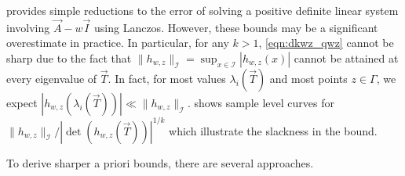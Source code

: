 provides simple reductions to the error of solving a positive definite linear system involving \( \vec{A} - w\vec{I} \) using Lanczos. 
However, these bounds may be a significant overestimate in practice.
In particular, for any \( k>1 \), \cref{eqn:dkwz_qwz} cannot be sharp due to the fact that \( \|h_{w,z}\|_{\mathcal{I}} = \sup_{x \in \mathcal{I}} |h_{w,z}(x)| \) cannot be attained at every eigenvalue of \( \vec{T} \).
In fact, for most values \( \lambda_i ( \vec{T} ) \) and most points \( z \in \Gamma \), we expect \( | h_{w,z}( \lambda_i ( \vec{T} ) ) | \ll \|h_{w,z}\|_{\mathcal{I}} \).
 shows sample level curves for \( \|h_{w,z}\|_{\mathcal{I}} / |\det(h_{w,z}(\vec{T}))|^{1/k} \) which illustrate  the slackness in the bound.


To derive sharper a priori bounds, there are several approaches. 

